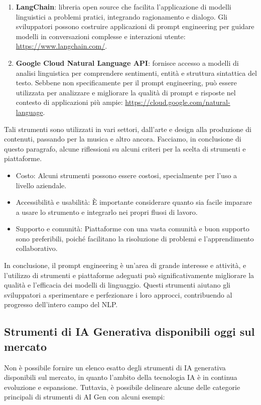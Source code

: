 \begin{enumerate}
            \item \textbf{LangChain}: libreria open source che facilita l'applicazione di modelli linguistici a problemi pratici, integrando ragionamento e dialogo. Gli sviluppatori possono costruire applicazioni di prompt engineering per guidare modelli in conversazioni complesse e interazioni utente: \url{https://www.langchain.com/}. 

            \item \textbf{Google Cloud Natural Language API}: fornisce accesso a modelli di analisi linguistica per comprendere sentimenti, entità e struttura sintattica del testo. Sebbene non specificamente per il prompt engineering, può essere utilizzata per analizzare e migliorare la qualità di prompt e risposte nel contesto di applicazioni più ampie: \url{https://cloud.google.com/natural-language}. 
        \end{enumerate}

        Tali strumenti sono utilizzati in vari settori, dall'arte e design alla produzione di contenuti, passando per la musica e altro ancora. Facciamo, in conclusione di questo paragrafo, alcune riflessioni su alcuni criteri per la scelta di strumenti e piattaforme. 

        \begin{itemize}
            \item Costo: Alcuni strumenti possono essere costosi, specialmente per l'uso a livello aziendale. 
            \item Accessibilità e usabilità: È importante considerare quanto sia facile imparare a usare lo strumento e integrarlo nei propri flussi di lavoro. 
            \item Supporto e comunità: Piattaforme con una vasta comunità e buon supporto sono preferibili, poiché facilitano la risoluzione di problemi e l'apprendimento collaborativo. 
        \end{itemize}

        In conclusione, il prompt engineering è un'area di grande interesse e attività, e l'utilizzo di strumenti e piattaforme adeguati può significativamente migliorare la qualità e l'efficacia dei modelli di linguaggio. Questi strumenti aiutano gli sviluppatori a sperimentare e perfezionare i loro approcci, contribuendo al progresso dell'intero campo del NLP. 
        
    \subsection{Strumenti di IA Generativa disponibili oggi sul mercato}
        Non è possibile fornire un elenco esatto degli strumenti di IA generativa disponibili sul mercato, in quanto l'ambito della tecnologia IA è in continua evoluzione e espansione. Tuttavia, è possibile delineare alcune delle categorie principali di strumenti di AI Gen con alcuni esempi: 

